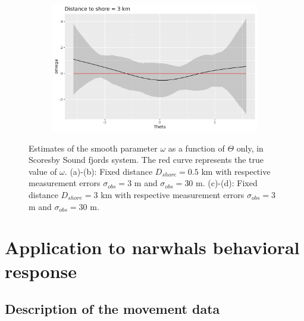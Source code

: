 \documentclass[11pt]{article}
\newcommand {\1}{\mathbb{1}}
\begin{document}
\begin{figure}[H]
\begin{subfigure}{0.48\textwidth}
		\caption{}
	\end{subfigure}
	\begin{subfigure}{0.48\textwidth}
		\centering
		\includegraphics[scale=0.3]{images/simulation study/crcvm_fjords_hf_ne1_omega_far.png}
		\caption{}
	\end{subfigure}
	
	\caption{Estimates of the smooth parameter $\omega$ as a function of $\Theta$ only, in Scoresby Sound fjords system. The red curve represents the true value of $\omega$. (a)-(b): Fixed distance $D_{shore}=0.5$ km with respective measurement errors $\sigma_{obs}=3$ m and $\sigma_{obs}=30$ m. (c)-(d): Fixed distance $D_{shore}=3$ km with respective measurement errors $\sigma_{obs}=3$ m and $\sigma_{obs}=30$ m.}
	\label{fig: marginal_estimates_fjords_CRCVM}

\end{figure}


\section{Application to narwhals behavioral response}


\subsection{Description of the movement data}
\end{document}
